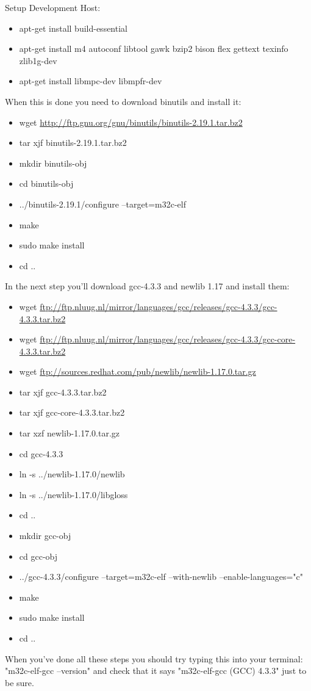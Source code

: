 Setup Development Host:
\begin{itemize}
\item apt-get install build-essential
\item apt-get install m4 autoconf libtool gawk bzip2 bison flex gettext texinfo zlib1g-dev 
\item apt-get install libmpc-dev libmpfr-dev
\end{itemize}

\noindent When this is done you need to download binutils and install it:
\begin{itemize}
\item wget \url{http://ftp.gnu.org/gnu/binutils/binutils-2.19.1.tar.bz2}
\item tar xjf binutils-2.19.1.tar.bz2
\item mkdir binutils-obj
\item cd binutils-obj
\item ../binutils-2.19.1/configure --target=m32c-elf
\item make
\item sudo make install
\item cd ..
\end{itemize}

\noindent In the next step you'll download gcc-4.3.3 and newlib 1.17 and install them:
\begin{itemize}
\item wget \url{ftp://ftp.nluug.nl/mirror/languages/gcc/releases/gcc-4.3.3/gcc-4.3.3.tar.bz2}
\item wget \url{ftp://ftp.nluug.nl/mirror/languages/gcc/releases/gcc-4.3.3/gcc-core-4.3.3.tar.bz2}
\item wget \url{ftp://sources.redhat.com/pub/newlib/newlib-1.17.0.tar.gz}
\item tar xjf gcc-4.3.3.tar.bz2
\item tar xjf gcc-core-4.3.3.tar.bz2
\item tar xzf newlib-1.17.0.tar.gz
\item cd gcc-4.3.3
\item ln -s ../newlib-1.17.0/newlib
\item ln -s ../newlib-1.17.0/libgloss
\item cd ..
\item mkdir gcc-obj
\item cd gcc-obj
\item ../gcc-4.3.3/configure --target=m32c-elf --with-newlib --enable-languages="c"
\item make
\item sudo make install
\item cd ..
\end{itemize}
When you've done all these steps you should try typing this into your terminal: "m32c-elf-gcc --version" and check that it says "m32c-elf-gcc (GCC) 4.3.3" just to be sure.

